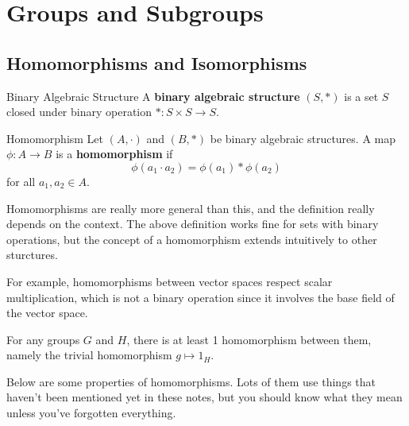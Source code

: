 \documentclass[10pt]{report}
\begin{document}
\tableofcontents



\chapter{Groups and Subgroups}




\section{Homomorphisms and Isomorphisms}

\begin{defn}{Binary Algebraic Structure}{}
        A \textbf{binary algebraic structure} $(S, *)$ is a set $S$ closed under binary operation $* : S \times S \to S$.
\end{defn}

\begin{defn}{Homomorphism}{}
	Let $(A, \cdot)$ and $(B,*)$ be binary algebraic structures. A map $\phi:A \to B$ is a \textbf{homomorphism} if
	\[
		\phi(a_1 \cdot a_2) = \phi(a_1) * \phi(a_2)
	\] for all $a_1, a_2 \in A$.
\end{defn}

Homomorphisms are really more general than this, and the definition really depends on the context. The above definition works fine for sets with binary operations, but the concept of a homomorphism extends intuitively to other sturctures.

For example, homomorphisms between vector spaces respect scalar multiplication, which is not a binary operation since it involves the base field of the vector space.

For any groups $G$ and $H$, there is at least 1 homomorphism between them, namely the trivial homomorphism $g \mapsto 1_H$.

Below are some properties of homomorphisms. Lots of them use things that haven't been mentioned yet in these notes, but you should know what they mean unless you've forgotten everything.
\end{document}
